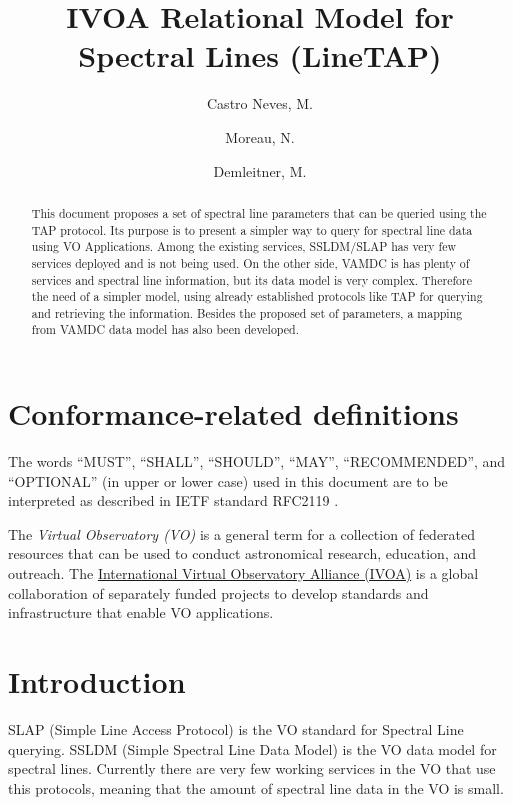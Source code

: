 \documentclass[11pt,a4paper]{ivoa}
\title{IVOA Relational Model for Spectral Lines (LineTAP)}
\author{Castro Neves, M.}
\author{Moreau, N.}
\author{Demleitner, M.}
\begin{document}
\begin{abstract}

This document proposes a set of  spectral line parameters that can be
queried using the TAP protocol. Its purpose is to present a simpler way
to query for spectral line data using VO Applications. Among the
existing services, SSLDM/SLAP has very few services deployed and is not
being used. On the other side, VAMDC is has plenty of services and
spectral line information, but its data model is very complex. Therefore
the need of a simpler model, using already established protocols like
TAP for querying and retrieving the information. Besides the proposed
set of parameters, a mapping from VAMDC data model has also been
developed.

\end{abstract}




\section*{Conformance-related definitions}

The words ``MUST'', ``SHALL'', ``SHOULD'', ``MAY'', ``RECOMMENDED'', and
``OPTIONAL'' (in upper or lower case) used in this document are to be
interpreted as described in IETF standard RFC2119 \citep{std:RFC2119}.

The \emph{Virtual Observatory (VO)} is a
general term for a collection of federated resources that can be used
to conduct astronomical research, education, and outreach.
The \href{http://www.ivoa.net}{International
Virtual Observatory Alliance (IVOA)} is a global
collaboration of separately funded projects to develop standards and
infrastructure that enable VO applications.


\section{Introduction}

SLAP (Simple Line Access Protocol)\citep{2010ivoa.specQ1209O} is the VO
standard for Spectral Line querying. SSLDM (Simple Spectral Line Data
Model)\citep{2010ivoa.spec.1209O} is the VO data model for spectral
lines.
Currently there are very few working services in the VO that use this protocols, meaning that the amount of spectral line data in the VO is small. 
\end{document}
